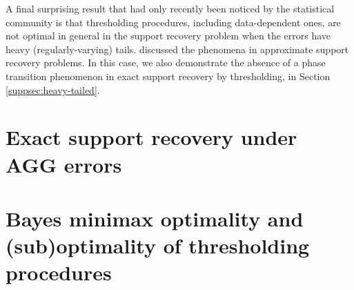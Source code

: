 \medskip

A final surprising result that had only recently been noticed by the statistical community is that thresholding procedures, including data-dependent ones, are not optimal in general in the support recovery problem when the errors have heavy (regularly-varying) tails. 
\citet{arias2019detection} discussed the phenomena in approximate support recovery problems.
In this case, we also demonstrate the absence of a phase transition phenomenon in exact support recovery by thresholding, in Section \ref{suppsec:heavy-tailed}. 






\section{Exact support recovery under AGG errors}
\label{sec:boundary}



\section{Bayes minimax optimality and (sub)optimality of thresholding procedures}
\label{sec:optimality}



%


